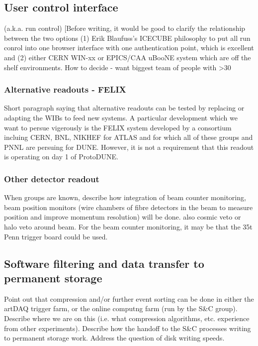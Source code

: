 \subsection{User control interface}

(a.k.a. run control) [Before writing, it would be good to clarify the relationship between the two options (1) Erik Blaufuss's ICECUBE philosophy to put all run conrol into one browser interface with one authentication point, which is excellent and (2) either CERN WIN-xx or EPICS/CAA uBooNE system which are off the shelf environments.   How to decide - want biggest team of people with >30%

\subsubsection{Alternative readouts - FELIX}
\label{ssec:daqfelix}

Short paragraph saying that alternative readouts can be tested by replacing or adapting the WIBs to feed new systems.  A particular development which we want to persue vigerously is the FELIX system developed by a consortium incluing CERN, BNL, NIKHEF for ATLAS and for which all of these groups and PNNL are persuing for DUNE.   However, it is not a requirement that this readout is operating on day 1 of ProtoDUNE.

\subsubsection{Other detector readout}

When groups are known, describe how integration of beam counter monitoring, beam position monitors (wire chambers of fibre detectors in the beam to measure position and improve momentum resolution) will be done. also cosmic veto or halo veto around beam.   For the beam counter monitoring, it may be that the 35t Penn trigger board could be used.

\subsection{Software filtering and data transfer to permanent storage}

Point out that compression and/or further event sorting can be done in either the artDAQ trigger farm, or the online computng farm (run by the S\&C group).  Describe where we are on this (i.e. what compression algorithms, etc.  experience from other experiments).  Describe how the handoff to the S\&C processes writing to permanent storage work. Address the question of disk writing speeds.


